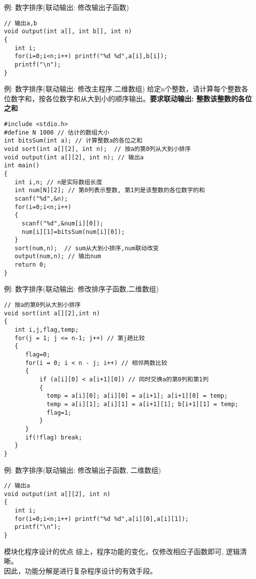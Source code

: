 \begin{frame}{例: 数字排序(联动输出: 修改输出子函数)}
\begin{lstlisting}
// 输出a,b
void output(int a[], int b[], int n)
{
   int i;
   for(i=0;i<n;i++) printf("%d %d",a[i],b[i]);
   printf("\n");
}
\end{lstlisting}
\end{frame}

\begin{frame}{例: 数字排序(联动输出: 修改主程序,二维数组)}
给定n个整数，请计算每个整数各位数字和，按各位数字和从大到小的顺序输出。\textbf{要求联动输出: 整数\quad 该整数的各位之和}
\begin{lstlisting}
#include <stdio.h>
#define N 1000 // 估计的数组大小
int bitsSum(int a); // 计算整数a的各位之和
void sort(int a[][2], int n);  // 按a的第0列从大到小排序
void output(int a[][2], int n); // 输出a
int main()
{
   int i,n; // n是实际数组长度 
   int num[N][2]; // 第0列表示整数, 第1列是该整数的各位数字的和  
   scanf("%d",&n);
   for(i=0;i<n;i++) 
   {
     scanf("%d",&num[i][0]); 
     num[i][1]=bitsSum(num[i][0]);
   }
   sort(num,n);  // sum从大到小排序,num联动改变
   output(num,n); // 输出num
   return 0;
}
\end{lstlisting}
\end{frame}

\begin{frame}{例: 数字排序(联动输出: 修改排序子函数,二维数组)}
\begin{lstlisting}
// 按a的第0列从大到小排序
void sort(int a[][2],int n)
{
   int i,j,flag,temp;
   for(j = 1; j <= n-1; j++) // 第j趟比较
   {
      flag=0;
      for(i = 0; i < n - j; i++) // 相邻两数比较
      {
          if (a[i][0] < a[i+1][0]) // 同时交换a的第0列和第1列
          { 
            temp = a[i][0]; a[i][0] = a[i+1]; a[i+1][0] = temp; 
            temp = a[i][1]; a[i][1] = a[i+1][1]; b[i+1][1] = temp; 
            flag=1;
          }
      }
      if(!flag) break;
   }
}
\end{lstlisting}
\end{frame}

\begin{frame}{例: 数字排序(联动输出: 修改输出子函数, 二维数组)}
\begin{lstlisting}
// 输出a
void output(int a[][2], int n)
{
   int i;
   for(i=0;i<n;i++) printf("%d %d",a[i][0],a[i][1]);
   printf("\n");
}
\end{lstlisting}

\begin{block}{模块化程序设计的优点}
	综上，程序功能的变化，仅修改相应子函数即可, 逻辑清晰。\\
	因此，功能分解是进行复杂程序设计的有效手段。
\end{block}
\end{frame}






